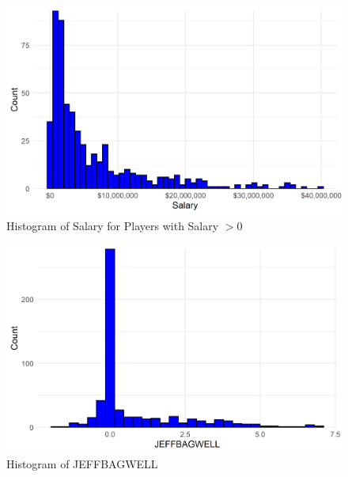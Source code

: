 \documentclass{article}
\begin{document}
\begin{figure}[h]
\caption{Histogram of Salary for Players with Salary $> 0$}
\label{fig:salary_hist}
\centering
\includegraphics[width=0.7\paperwidth, scale=1.25]{salary_hist.png}
\end{figure}

\begin{figure}[h]
\caption{Histogram of JEFFBAGWELL}
\label{fig:bwar_hist}
\centering
\includegraphics[width=0.7\paperwidth, scale=1.25]{war_hist.png}
\end{figure}


\end{document}
